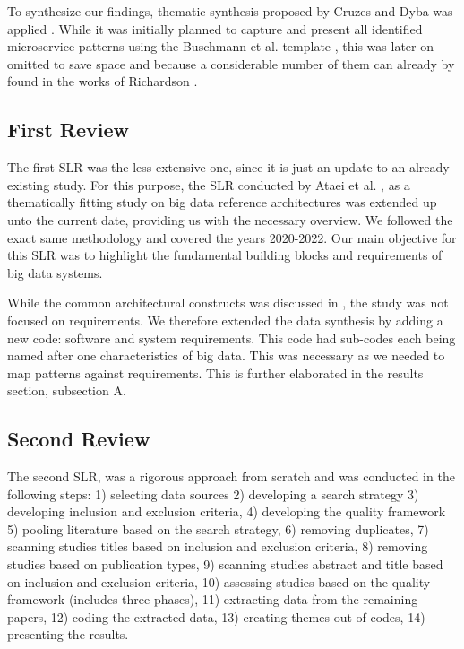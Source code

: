 \documentclass[conference]{IEEEtran}
\begin{document}
To synthesize our findings, thematic synthesis proposed by Cruzes and Dyba was applied \cite{Cruzes.2011}. While it was initially planned to capture and present all identified microservice patterns using the Buschmann et al. template \cite{buschmann2008pattern}, this was later on omitted to save space and because a considerable number of them can already by found in the works of Richardson \cite{Richardson.2022}.


\subsection{First Review}

The first SLR was the less extensive one, since it is just an update to an already existing study. For this purpose, the SLR conducted by Ataei et al. \cite{Ataei.2020}, as a thematically fitting study on big data reference architectures was extended up unto the current date, providing us with the necessary overview. We followed the exact same methodology and covered the years 2020-2022. Our main objective for this SLR was to highlight the fundamental building blocks and requirements of big data systems. 

While the common architectural constructs was discussed in \cite{Ataei.2020}, the study was not focused on requirements. We therefore extended the data synthesis by adding a new code: software and system requirements. This code had sub-codes each being named after one characteristics of big data. This was necessary as we needed to map patterns against requirements. This is further elaborated in the results section, subsection A.

\subsection{Second Review}

The second SLR, was a rigorous approach from scratch and was conducted in the following steps: 1) selecting data sources 2) developing a search strategy 3) developing inclusion and exclusion criteria, 4) developing the quality framework 5) pooling literature based on the search strategy, 6) removing duplicates, 7) scanning studies titles based on inclusion and exclusion criteria, 8) removing studies based on publication types, 9) scanning studies abstract and title based on inclusion and exclusion criteria, 10) assessing studies based on the quality framework (includes three phases), 11) extracting data from the remaining papers, 12) coding the extracted data, 13) creating themes out of codes, 14) presenting the results. 
\end{document}
